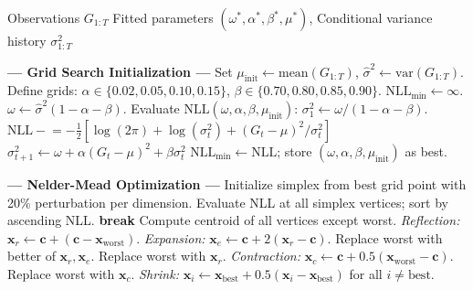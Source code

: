 \begin{algorithm}[tp]
\caption{GARCH(1,1) maximum likelihood estimation via grid-initialized Nelder-Mead}
\label{alg:garch_fit}
\small
\begin{algorithmic}[1]
\REQUIRE Observations $G_{1:T}$
\ENSURE Fitted parameters $(\omega^*, \alpha^*, \beta^*, \mu^*)$, Conditional variance history $\sigma^2_{1:T}$

\STATE \textbf{--- Grid Search Initialization ---}
\STATE Set $\mu_{\text{init}} \leftarrow \text{mean}(G_{1:T})$, \quad $\hat{\sigma}^2 \leftarrow \text{var}(G_{1:T})$.
\STATE Define grids: $\alpha \in \{0.02, 0.05, 0.10, 0.15\}$, \quad $\beta \in \{0.70, 0.80, 0.85, 0.90\}$.
\STATE $\text{NLL}_{\min} \leftarrow \infty$.
    \STATE $\omega \leftarrow \hat{\sigma}^2 (1 - \alpha - \beta)$.
    \STATE Evaluate $\text{NLL}(\omega, \alpha, \beta, \mu_{\text{init}})$:
    \STATE \quad $\sigma_1^2 \leftarrow \omega / (1 - \alpha - \beta)$.
        \STATE $\text{NLL} \mathrel{-}= -\tfrac{1}{2}\left[\log(2\pi) + \log(\sigma_t^2) + (G_t - \mu)^2 / \sigma_t^2\right]$
            \STATE $\sigma_{t+1}^2 \leftarrow \omega + \alpha (G_t - \mu)^2 + \beta \sigma_t^2$
        \ENDIF
    \ENDFOR
        \STATE $\text{NLL}_{\min} \leftarrow \text{NLL}$; \quad store $(\omega, \alpha, \beta, \mu_{\text{init}})$ as best.
    \ENDIF
\ENDFOR

\STATE \textbf{--- Nelder-Mead Optimization ---}
\STATE Initialize simplex from best grid point with 20\% perturbation per dimension.
    \STATE Evaluate NLL at all simplex vertices; sort by ascending NLL.
        \STATE \textbf{break} 
    \ENDIF
    \STATE Compute centroid of all vertices except worst.
    \STATE \textit{Reflection:} $\mathbf{x}_r \leftarrow \mathbf{c} + (\mathbf{c} - \mathbf{x}_{\text{worst}})$.
        \STATE \textit{Expansion:} $\mathbf{x}_e \leftarrow \mathbf{c} + 2(\mathbf{x}_r - \mathbf{c})$. Replace worst with better of $\mathbf{x}_r, \mathbf{x}_e$.
        \STATE Replace worst with $\mathbf{x}_r$.
    \ELSE
        \STATE \textit{Contraction:} $\mathbf{x}_c \leftarrow \mathbf{c} + 0.5(\mathbf{x}_{\text{worst}} - \mathbf{c})$.
            \STATE Replace worst with $\mathbf{x}_c$.
        \ELSE
            \STATE \textit{Shrink:} $\mathbf{x}_i \leftarrow \mathbf{x}_{\text{best}} + 0.5(\mathbf{x}_i - \mathbf{x}_{\text{best}})$ for all $i \neq \text{best}$.
        \ENDIF
    \ENDIF
\ENDFOR


\end{algorithmic}
\end{algorithm}
